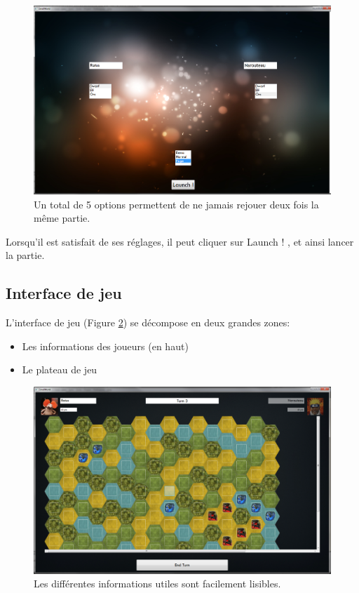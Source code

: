 		\begin{figure}[h]
			\centering
			\includegraphics[width=1\textwidth]{figure/new_game.png}
			\caption{Un total de 5 options permettent de ne jamais rejouer deux fois la même partie.}
			\label{fig:new_game}
		\end{figure}

		Lorsqu'il est satisfait de ses réglages, il peut cliquer sur \og Launch ! \fg, et ainsi lancer la partie.

	\subsection{Interface de jeu}
		L'interface de jeu (Figure \ref{fig:in_game}) se décompose en deux grandes zones:
		\begin{itemize}
			\item Les informations des joueurs (en haut)
			\item Le plateau de jeu
		\end{itemize}

		\begin{figure}[h]
			\centering
			\includegraphics[width=1\textwidth]{figure/in_game.png}
			\caption{Les différentes informations utiles sont facilement lisibles.}
			\label{fig:in_game}
		\end{figure}


